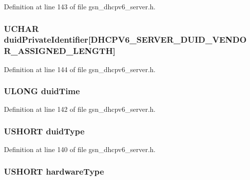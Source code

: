 Definition at line 143 of file gsn\_\-dhcpv6\_\-server.h.

\hypertarget{a00017_a4f3cc9f4ebb747c6f04a6e4de81f73b7}{
\subsubsection[{duidPrivateIdentifier}]{\setlength{\rightskip}{0pt plus 5cm}UCHAR {\bf duidPrivateIdentifier}\mbox{[}DHCPV6\_\-SERVER\_\-DUID\_\-VENDOR\_\-ASSIGNED\_\-LENGTH\mbox{]}}}
\label{a00017_a4f3cc9f4ebb747c6f04a6e4de81f73b7}


Definition at line 144 of file gsn\_\-dhcpv6\_\-server.h.

\hypertarget{a00017_ae5c28529de50ed9745a98614305a42a2}{
\subsubsection[{duidTime}]{\setlength{\rightskip}{0pt plus 5cm}ULONG {\bf duidTime}}}
\label{a00017_ae5c28529de50ed9745a98614305a42a2}


Definition at line 142 of file gsn\_\-dhcpv6\_\-server.h.

\hypertarget{a00017_af3a4a7f1db422f485d83bdaec4f92640}{
\subsubsection[{duidType}]{\setlength{\rightskip}{0pt plus 5cm}USHORT {\bf duidType}}}
\label{a00017_af3a4a7f1db422f485d83bdaec4f92640}


Definition at line 140 of file gsn\_\-dhcpv6\_\-server.h.

\hypertarget{a00017_a1dc99d073ea18e394b2daeb98968afc6}{
\subsubsection[{hardwareType}]{\setlength{\rightskip}{0pt plus 5cm}USHORT {\bf hardwareType}}}
\label{a00017_a1dc99d073ea18e394b2daeb98968afc6}


